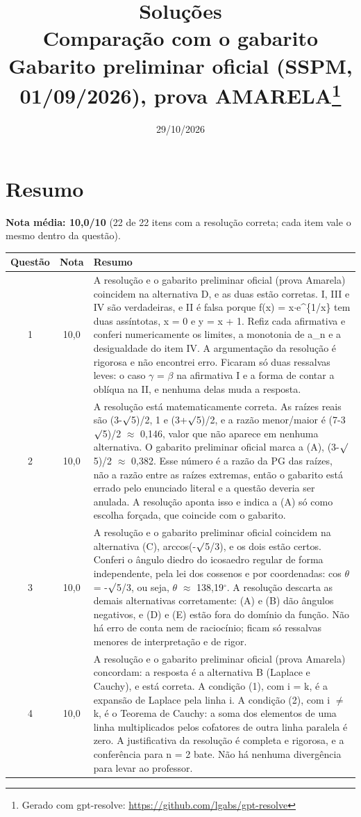 \documentclass{article}%
\title{Soluções\\[4pt]\large Comparação com o gabarito Gabarito preliminar oficial (SSPM, 01/09/2026), prova AMARELA\thanks{Gerado com gpt-resolve: \url{https://github.com/lgabs/gpt-resolve}}}%
\date{29/10/2026}%
\begin{document}
%
\normalsize%
\maketitle%
\section*{Resumo}\textbf{Nota média: 10,0/10} (22 de 22 itens com a resolução correta; cada item vale o mesmo dentro da questão).\par\medskip%
\begin{longtable}{@{}c c p{}@{}}\toprule Questão & Nota & Resumo \\ \midrule
1 & 10,0 & A resolução e o gabarito preliminar oficial (prova Amarela) coincidem na alternativa D, e as duas estão corretas. I, III e IV são verdadeiras, e II é falsa porque f(x) = x$\cdot$e\^{}\{1/x\} tem duas assíntotas, x = 0 e y = x + 1. Refiz cada afirmativa e conferi numericamente os limites, a monotonia de a\_n e a desigualdade do item IV. A argumentação da resolução é rigorosa e não encontrei erro. Ficaram só duas ressalvas leves: o caso $\gamma$ = $\beta$ na afirmativa I e a forma de contar a oblíqua na II, e nenhuma delas muda a resposta. \\
2 & 10,0 & A resolução está matematicamente correta. As raízes reais são (3-$\surd$5)/2, 1 e (3+$\surd$5)/2, e a razão menor/maior é (7-3$\surd$5)/2 $\approx$ 0,146, valor que não aparece em nenhuma alternativa. O gabarito preliminar oficial marca a (A), (3-$\surd$5)/2 $\approx$ 0,382. Esse número é a razão da PG das raízes, não a razão entre as raízes extremas, então o gabarito está errado pelo enunciado literal e a questão deveria ser anulada. A resolução aponta isso e indica a (A) só como escolha forçada, que coincide com o gabarito. \\
3 & 10,0 & A resolução e o gabarito preliminar oficial coincidem na alternativa (C), arccos(-$\surd$5/3), e os dois estão certos. Conferi o ângulo diedro do icosaedro regular de forma independente, pela lei dos cossenos e por coordenadas: cos $\theta$ = -$\surd$5/3, ou seja, $\theta$ $\approx$ 138,19$^\circ$. A resolução descarta as demais alternativas corretamente: (A) e (B) dão ângulos negativos, e (D) e (E) estão fora do domínio da função. Não há erro de conta nem de raciocínio; ficam só ressalvas menores de interpretação e de rigor. \\
4 & 10,0 & A resolução e o gabarito preliminar oficial (prova Amarela) concordam: a resposta é a alternativa B (Laplace e Cauchy), e está correta. A condição (1), com i = k, é a expansão de Laplace pela linha i. A condição (2), com i $\neq$ k, é o Teorema de Cauchy: a soma dos elementos de uma linha multiplicados pelos cofatores de outra linha paralela é zero. A justificativa da resolução é completa e rigorosa, e a conferência para n = 2 bate. Não há nenhuma divergência para levar ao professor. \\

\end{longtable}
\end{document}

